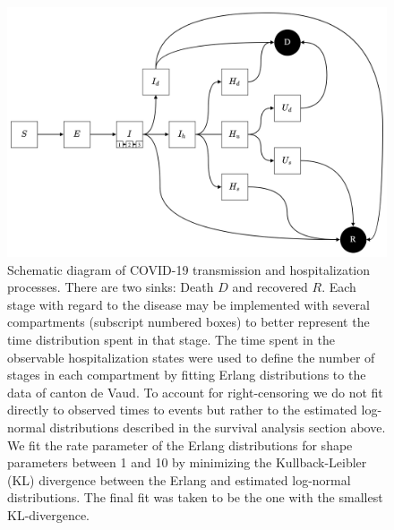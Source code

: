  \begin{figure}[!htb]
\begin{center}
\includegraphics{fig_covid-switzerland-npi/fig_supp/diagram.png}
\caption[Schematic diagram of COVID-19 transmission and hospitalization processes.]{Schematic diagram of COVID-19 transmission and hospitalization processes. There are two sinks: Death $D$ and recovered $R$. Each stage with regard to the disease may be implemented with several compartments (subscript numbered boxes) to better represent the time distribution spent in that stage. The time spent in the observable hospitalization states were used to define the number of stages in each compartment by fitting Erlang distributions to the data of canton de Vaud. To account for right-censoring we do not fit directly to observed times to events but rather to the estimated log-normal distributions described in the survival analysis section above. We fit the rate parameter of the Erlang distributions for shape parameters between 1 and 10 by minimizing the Kullback-Leibler (KL) divergence between the Erlang and estimated log-normal distributions. The final fit was taken to be the one with the smallest KL-divergence.}
\label{fig:covid-ch-diagram}
\end{center}
\end{figure}
